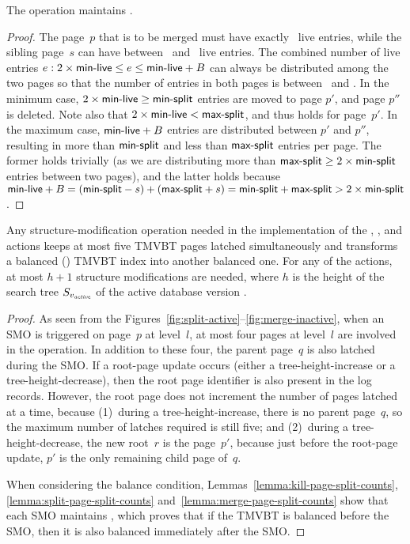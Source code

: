 \thmskip
\begin{lemma}
\label{lemma:merge-page-split-counts}
The  operation maintains
.
\end{lemma}
\begin{proof}
The page~$p$ that is to be merged must have exactly \minlive\ live entries,
while the sibling page~$s$ can have between \minlive\ and \capacity\ live
entries. 
The combined number of live entries $e: 2 \times \text{\textsf{min-live}} \leq e \leq
\text{\textsf{min-live}} + B$ can always be distributed among the two pages so that
the number of entries in both pages is between \minsplit\ and \maxsplit. 
In the minimum case, $2 \times \text{\textsf{min-live}} \geq \text{\textsf{min-split}}$ entries are
moved to page $p'$, and page $p''$ is deleted.
Note also that $2 \times \text{\textsf{min-live}} < \text{\textsf{max-split}}$, and
 thus holds for page~$p'$.
In the maximum case, $\text{\textsf{min-live}} + B$ entries are distributed
between $p'$ and $p''$, resulting in more than $\text{\textsf{min-split}}$ and less
than $\text{\textsf{max-split}}$ entries per page. 
The former holds trivially (as we are distributing more than
$\text{\textsf{max-split}} \geq 2 \times \text{\textsf{min-split}}$ entries between two pages), and the
latter holds because $\text{\textsf{min-live}} + B = (\text{\textsf{min-split}} - s) + (\text{\textsf{max-split}} +
s) = \text{\textsf{min-split}} + \text{\textsf{max-split}} > 2 \times \text{\textsf{min-split}}$.
\end{proof}
\thmskip

\thmskip
\begin{lemma}
\label{lemma:tmvbt-latchcount}
Any structure-modification operation needed in the implementation of
the , ,  and
 actions keeps at most five TMVBT pages latched
simultaneously and transforms a balanced ()
TMVBT index into another balanced one. 
For any of the actions, at most $h+1$ structure modifications are needed,
where $h$ is the height of the search tree $S_{\smash{v_{\text{\textit{active}}}}}$ of the active
database version \actver.
\end{lemma}
\begin{proof}
As seen from the Figures~\ref{fig:split-active}--\ref{fig:merge-inactive},
when an SMO is triggered on page~$p$ at level~$l$, at most four pages at
level~$l$ are involved in the operation.
In addition to these four, the parent page~$q$ is also latched during the
SMO\@.
If a root-page update occurs (either a tree-height-increase or a
tree-height-decrease), then the root page identifier is also present in the
log records.
However, the root page does not increment the number of pages latched at a
time, because
(1)~during a tree-height-increase, there is no parent page~$q$, so the maximum
number of latches required is still five; and
(2)~during a tree-height-decrease, the new root~$r$ is the page~$p'$, because
just before the root-page update, $p'$ is the only remaining child page
of~$q$.

When considering the balance condition,
Lemmas~\ref{lemma:kill-page-split-counts},
\ref{lemma:split-page-split-counts} and~\ref{lemma:merge-page-split-counts}
show that each SMO maintains , which proves that
if the TMVBT is balanced before the SMO, then it is also balanced  
immediately after the SMO\@.
\end{proof}
\thmskip

